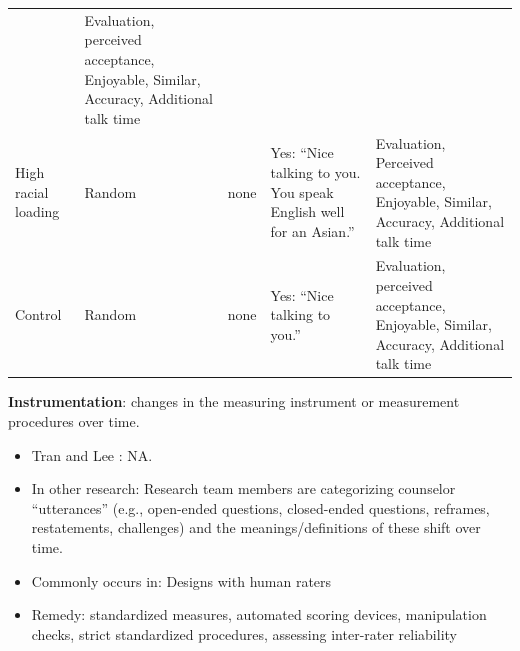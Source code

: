 \documentclass[
  english,
]{book}
\providecommand{\tightlist}{%
  \setlength{\itemsep}{0pt}\setlength{\parskip}{0pt}}
\begin{document}
\begin{longtable}[]{@{}lllll@{}}
\begin{minipage}[t]{0.15\columnwidth}
\end{minipage} & \begin{minipage}[t]{0.22\columnwidth}\raggedright
Evaluation, perceived acceptance, Enjoyable, Similar, Accuracy, Additional talk time\strut
\end{minipage}\tabularnewline
\begin{minipage}[t]{0.10\columnwidth}\raggedright
High racial loading\strut
\end{minipage} & \begin{minipage}[t]{0.17\columnwidth}\raggedright
Random\strut
\end{minipage} & \begin{minipage}[t]{0.22\columnwidth}\raggedright
none\strut
\end{minipage} & \begin{minipage}[t]{0.15\columnwidth}\raggedright
Yes: ``Nice talking to you. You speak English well for an Asian.''\strut
\end{minipage} & \begin{minipage}[t]{0.22\columnwidth}\raggedright
Evaluation, Perceived acceptance, Enjoyable, Similar, Accuracy, Additional talk time\strut
\end{minipage}\tabularnewline
\begin{minipage}[t]{0.10\columnwidth}\raggedright
Control\strut
\end{minipage} & \begin{minipage}[t]{0.17\columnwidth}\raggedright
Random\strut
\end{minipage} & \begin{minipage}[t]{0.22\columnwidth}\raggedright
none\strut
\end{minipage} & \begin{minipage}[t]{0.15\columnwidth}\raggedright
Yes: ``Nice talking to you.''\strut
\end{minipage} & \begin{minipage}[t]{0.22\columnwidth}\raggedright
Evaluation, perceived acceptance, Enjoyable, Similar, Accuracy, Additional talk time\strut
\end{minipage}\tabularnewline
\bottomrule
\end{longtable}

\textbf{Instrumentation}: changes in the measuring instrument or measurement procedures over time.

\begin{itemize}
\tightlist
\item
  Tran and Lee \citeyearpar{tran_you_2014}: NA.
\item
  In other research: Research team members are categorizing counselor ``utterances'' (e.g., open-ended questions, closed-ended questions, reframes, restatements, challenges) and the meanings/definitions of these shift over time.
\item
  Commonly occurs in: Designs with human raters
\item
  Remedy: standardized measures, automated scoring devices, manipulation checks, strict standardized procedures, assessing inter-rater reliability
\end{itemize}
\end{document}
